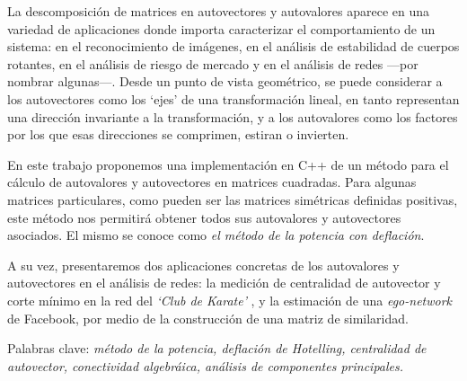 La descomposición de matrices en autovectores y autovalores aparece en una variedad de aplicaciones donde importa caracterizar el comportamiento de un sistema: en el reconocimiento de imágenes, en el análisis de estabilidad de cuerpos rotantes, en el análisis de riesgo de mercado y en el análisis de redes ---por nombrar algunas---. Desde un punto de vista geométrico, se puede considerar a los autovectores como los `ejes' de una transformación lineal, en tanto representan una dirección invariante a la transformación, y a los autovalores como los factores por los que esas direcciones se comprimen, estiran o invierten. 

\vspace{1em}
En este trabajo proponemos una implementación en C++ de un método para el cálculo de autovalores y autovectores en matrices cuadradas. Para algunas matrices particulares, como pueden ser las matrices simétricas definidas positivas, este método nos permitirá obtener todos sus autovalores y autovectores asociados. El mismo se conoce como \textit{el método de la potencia con deflación}. 

A su vez, presentaremos dos aplicaciones concretas de los autovalores y autovectores en el análisis de redes: la medición de centralidad de autovector y corte mínimo en la red del \textit{`Club de Karate'} \cite{Zachary}, y la estimación de una \textit{ego-network} \cite{Leskovec} de Facebook, por medio de la construcción de una matriz de similaridad.  

\vspace{1em}
\noindent Palabras clave: \textit{método de la potencia, deflación de Hotelling, centralidad de autovector, conectividad algebráica, análisis de componentes principales.}
